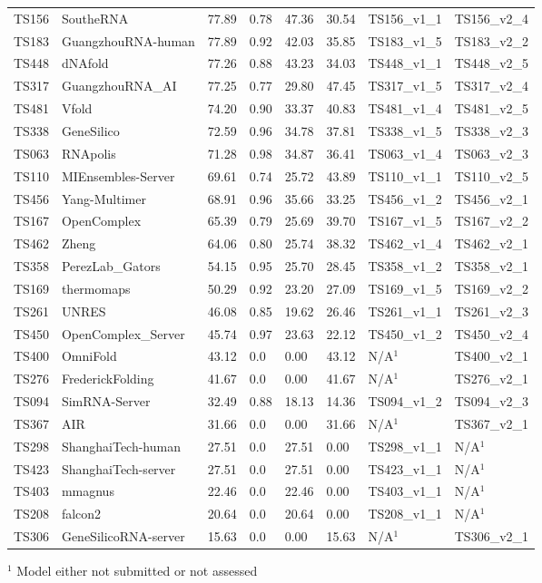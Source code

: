 \begin{table}[ht]
{\begin{tabular}{llllllll}
TS156 & SoutheRNA & 77.89 & 0.78 & 47.36 & 30.54 & TS156\_v1\_1 & TS156\_v2\_4 \\ 
TS183 & GuangzhouRNA-human & 77.89 & 0.92 & 42.03 & 35.85 & TS183\_v1\_5 & TS183\_v2\_2 \\ 
TS448 & dNAfold & 77.26 & 0.88 & 43.23 & 34.03 & TS448\_v1\_1 & TS448\_v2\_5 \\ 
TS317 & GuangzhouRNA\_AI & 77.25 & 0.77 & 29.80 & 47.45 & TS317\_v1\_5 & TS317\_v2\_4 \\ 
TS481 & Vfold & 74.20 & 0.90 & 33.37 & 40.83 & TS481\_v1\_4 & TS481\_v2\_5 \\ 
TS338 & GeneSilico & 72.59 & 0.96 & 34.78 & 37.81 & TS338\_v1\_5 & TS338\_v2\_3 \\ 
TS063 & RNApolis & 71.28 & 0.98 & 34.87 & 36.41 & TS063\_v1\_4 & TS063\_v2\_3 \\ 
TS110 & MIEnsembles-Server & 69.61 & 0.74 & 25.72 & 43.89 & TS110\_v1\_1 & TS110\_v2\_5 \\ 
TS456 & Yang-Multimer & 68.91 & 0.96 & 35.66 & 33.25 & TS456\_v1\_2 & TS456\_v2\_1 \\ 
TS167 & OpenComplex & 65.39 & 0.79 & 25.69 & 39.70 & TS167\_v1\_5 & TS167\_v2\_2 \\ 
TS462 & Zheng & 64.06 & 0.80 & 25.74 & 38.32 & TS462\_v1\_4 & TS462\_v2\_1 \\ 
TS358 & PerezLab\_Gators & 54.15 & 0.95 & 25.70 & 28.45 & TS358\_v1\_2 & TS358\_v2\_1 \\ 
TS169 & thermomaps & 50.29 & 0.92 & 23.20 & 27.09 & TS169\_v1\_5 & TS169\_v2\_2 \\ 
TS261 & UNRES & 46.08 & 0.85 & 19.62 & 26.46 & TS261\_v1\_1 & TS261\_v2\_3 \\ 
TS450 & OpenComplex\_Server & 45.74 & 0.97 & 23.63 & 22.12 & TS450\_v1\_2 & TS450\_v2\_4 \\ 
TS400 & OmniFold & 43.12 & 0.0 & 0.00 & 43.12 & N/A$^{1}$ & TS400\_v2\_1 \\ 
TS276 & FrederickFolding & 41.67 & 0.0 & 0.00 & 41.67 & N/A$^{1}$ & TS276\_v2\_1 \\ 
TS094 & SimRNA-Server & 32.49 & 0.88 & 18.13 & 14.36 & TS094\_v1\_2 & TS094\_v2\_3 \\ 
TS367 & AIR & 31.66 & 0.0 & 0.00 & 31.66 & N/A$^{1}$ & TS367\_v2\_1 \\ 
TS298 & ShanghaiTech-human & 27.51 & 0.0 & 27.51 & 0.00 & TS298\_v1\_1 & N/A$^{1}$ \\ 
TS423 & ShanghaiTech-server & 27.51 & 0.0 & 27.51 & 0.00 & TS423\_v1\_1 & N/A$^{1}$ \\ 
TS403 & mmagnus & 22.46 & 0.0 & 22.46 & 0.00 & TS403\_v1\_1 & N/A$^{1}$ \\ 
TS208 & falcon2 & 20.64 & 0.0 & 20.64 & 0.00 & TS208\_v1\_1 & N/A$^{1}$ \\ 
TS306 & GeneSilicoRNA-server & 15.63 & 0.0 & 0.00 & 15.63 & N/A$^{1}$ & TS306\_v2\_1 \\ 
\bottomrule
\end{tabular}%
}
\begin{flushleft}\footnotesize $^{1}$ Model either not submitted or not assessed\end{flushleft}
\end{table}
